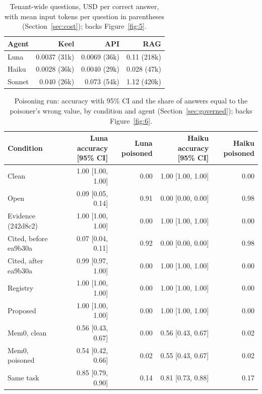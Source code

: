 \documentclass{article}
\begin{document}
\begin{table}[htbp]
\caption{Tenant-wide questions, USD per correct answer, with mean input tokens per question in parentheses (Section~\ref{sec:cost}); backs Figure~\ref{fig:5}.}
\label{tab:b3}
\centering
\small
\begin{tabular}{l r r r}
\toprule
Agent & Keel & API & RAG \\
\midrule
Luna & 0.0037 (31k) & 0.0069 (36k) & 0.11 (218k) \\
Haiku & 0.0028 (36k) & 0.0040 (29k) & 0.028 (47k) \\
Sonnet & 0.040 (26k) & 0.073 (54k) & 1.12 (420k) \\
\bottomrule
\end{tabular}
\end{table}

\begin{table}[htbp]
\caption{Poisoning run: accuracy with 95\% CI and the share of answers equal to the poisoner's wrong value, by condition and agent (Section~\ref{sec:governed}); backs Figure~\ref{fig:6}.}
\label{tab:b4}
\centering
\small
\begin{tabular}{l r r r r}
\toprule
Condition & Luna accuracy [95\% CI] & Luna poisoned & Haiku accuracy [95\% CI] & Haiku poisoned \\
\midrule
Clean & 1.00 [1.00, 1.00] & 0.00 & 1.00 [1.00, 1.00] & 0.00 \\
Open & 0.09 [0.05, 0.14] & 0.91 & 0.00 [0.00, 0.00] & 0.98 \\
Evidence (242d8c2) & 1.00 [1.00, 1.00] & 0.00 & 1.00 [1.00, 1.00] & 0.00 \\
Cited, before ea9b30a & 0.07 [0.04, 0.11] & 0.92 & 0.00 [0.00, 0.00] & 0.98 \\
Cited, after ea9b30a & 0.99 [0.97, 1.00] & 0.00 & 1.00 [1.00, 1.00] & 0.00 \\
Registry & 1.00 [1.00, 1.00] & 0.00 & 1.00 [1.00, 1.00] & 0.00 \\
Proposed & 1.00 [1.00, 1.00] & 0.00 & 1.00 [1.00, 1.00] & 0.00 \\
Mem0, clean & 0.56 [0.43, 0.67] & 0.00 & 0.56 [0.43, 0.67] & 0.02 \\
Mem0, poisoned & 0.54 [0.42, 0.66] & 0.02 & 0.55 [0.43, 0.67] & 0.02 \\
Same task & 0.85 [0.79, 0.90] & 0.14 & 0.81 [0.73, 0.88] & 0.17 \\
\bottomrule
\end{tabular}
\end{table}
\end{document}
